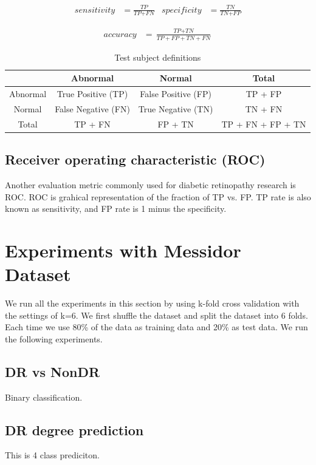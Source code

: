 \begin{align*}
    \textit{sensitivity} &= \frac{\textit{TP}}{\textit{TP} + \textit{FN}}
    &
    \textit{specificity} &= \frac{\textit{TN}}{\textit{TN} + \textit{FP}}
\end{align*}

\begin{align*}
    \textit{accuracy} &= \frac{\textit{TP} + \textit{TN}}{\textit{TP} + \textit{FP} + \textit{TN} + \textit{FN}}
\end{align*}

\begin{table}[t]
\centering
\caption{Test subject definitions} 
\label{tab:configs}
\begin{tabular}{|c|c|c|c|} \hline
     & Abnormal & Normal & Total  \\ \hline
     Abnormal& True Positive (TP) & False Positive (FP) & TP + FP \\ \hline
     Normal & False Negative (FN) & True Negative (TN) & TN + FN \\ \hline
     Total & TP + FN &  FP + TN & TP + FN + FP + TN \\ \hline
\end{tabular}
\end{table}

\subsection{Receiver operating characteristic (ROC)}
Another evaluation metric commonly used for diabetic retinopathy research is ROC. ROC is grahical representation of the fraction of TP  vs. FP. TP rate is also known as sensitivity, and FP rate is 1 minus the specificity. 


\section{Experiments with Messidor Dataset}
We run all the experiments in this section by using k-fold cross validation with the settings of k=6. We first shuffle the dataset and split the dataset into 6 folds. Each time we use 80\% of the data as training data and 20\% as test data. We run the following experiments.
\subsection{DR vs NonDR}
Binary classification.
\subsection{DR degree prediction}
This is 4 class prediciton.
